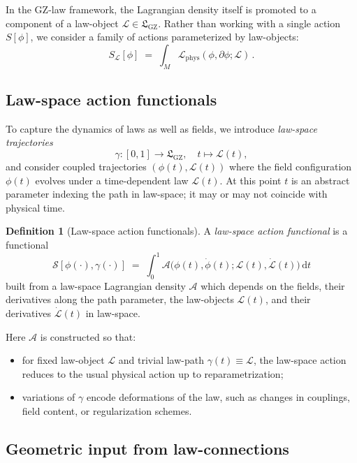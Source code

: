 \documentclass[11pt]{book}
\newcommand{\GZLS}{\ensuremath{\mathfrak{L}_{\mathrm{GZ}}}}
\newcommand{\Base}{\ensuremath{M}}
\theoremstyle{plain}
\theoremstyle{definition}
\newtheorem{definition}[theorem]{Definition}
\theoremstyle{remark}
\begin{document}
In the GZ-law framework, the Lagrangian density itself is promoted to
a component of a law-object $\mathcal{L} \in \GZLS$. Rather than
working with a single action $S[\phi]$, we consider a family of
actions parameterized by law-objects:
\[
   S_{\mathcal{L}}[\phi]
   \;=\;
   \int_{\Base} \mathcal{L}_{\mathrm{phys}}(\phi,\partial\phi; \mathcal{L})\,.
\]

\subsection{Law-space action functionals}

To capture the dynamics of laws as well as fields, we introduce
\emph{law-space trajectories}
\[
   \gamma \colon [0,1] \longrightarrow \GZLS,
   \quad
   t \longmapsto \mathcal{L}(t),
\]
and consider coupled trajectories $(\phi(t),\mathcal{L}(t))$ where the
field configuration $\phi(t)$ evolves under a time-dependent law
$\mathcal{L}(t)$. At this point $t$ is an abstract parameter indexing
the path in law-space; it may or may not coincide with physical time.

\begin{definition}[Law-space action functionals]
  A \emph{law-space action functional} is a functional
  \[
     \mathcal{S}[\phi(\cdot),\gamma(\cdot)]
     \;=\;
     \int_0^1 \mathcal{A}\bigl(\phi(t),\dot{\phi}(t);\mathcal{L}(t),\dot{\mathcal{L}}(t)\bigr)\,\mathrm{d}t
  \]
  built from a law-space Lagrangian density
  $\mathcal{A}$ which depends on the fields, their derivatives along
  the path parameter, the law-objects $\mathcal{L}(t)$, and their
  derivatives $\dot{\mathcal{L}}(t)$ in law-space.
\end{definition}

Here $\mathcal{A}$ is constructed so that:
\begin{itemize}
  \item for fixed law-object $\mathcal{L}$ and trivial law-path
        $\gamma(t) \equiv \mathcal{L}$, the law-space action reduces
        to the usual physical action up to reparametrization;
  \item variations of $\gamma$ encode deformations of the law, such as
        changes in couplings, field content, or regularization schemes.
\end{itemize}

\subsection{Geometric input from law-connections}
\end{document}
